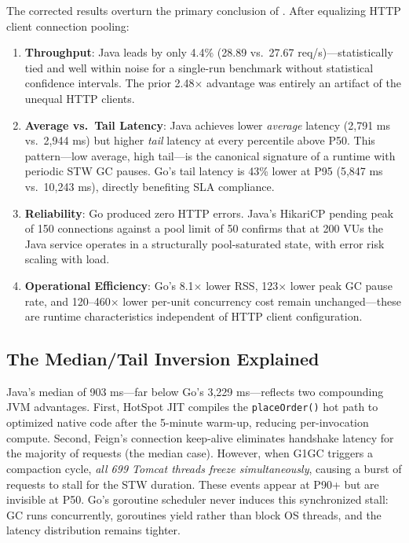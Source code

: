 \documentclass[conference]{IEEEtran}
\begin{document}
The corrected results overturn the primary conclusion of \cite{b10}. After equalizing HTTP client connection pooling:

\begin{enumerate}
\item \textbf{Throughput}: Java leads by only 4.4\% (28.89 vs.\ 27.67 req/s)---statistically tied and well within noise for a single-run benchmark without statistical confidence intervals. The prior 2.48$\times$ advantage was entirely an artifact of the unequal HTTP clients.

\item \textbf{Average vs.\ Tail Latency}: Java achieves lower \textit{average} latency (2,791 ms vs.\ 2,944 ms) but higher \textit{tail} latency at every percentile above P50. This pattern---low average, high tail---is the canonical signature of a runtime with periodic STW GC pauses. Go's tail latency is 43\% lower at P95 (5,847 ms vs.\ 10,243 ms), directly benefiting SLA compliance.

\item \textbf{Reliability}: Go produced zero HTTP errors. Java's HikariCP pending peak of 150 connections against a pool limit of 50 confirms that at 200 VUs the Java service operates in a structurally pool-saturated state, with error risk scaling with load.

\item \textbf{Operational Efficiency}: Go's 8.1$\times$ lower RSS, 123$\times$ lower peak GC pause rate, and 120--460$\times$ lower per-unit concurrency cost remain unchanged---these are runtime characteristics independent of HTTP client configuration.
\end{enumerate}

\subsection{The Median/Tail Inversion Explained}

Java's median of 903 ms---far below Go's 3,229 ms---reflects two compounding JVM advantages. First, HotSpot JIT compiles the \texttt{placeOrder()} hot path to optimized native code after the 5-minute warm-up, reducing per-invocation compute. Second, Feign's connection keep-alive eliminates handshake latency for the majority of requests (the median case). However, when G1GC triggers a compaction cycle, \textit{all 699 Tomcat threads freeze simultaneously}, causing a burst of requests to stall for the STW duration. These events appear at P90+ but are invisible at P50. Go's goroutine scheduler never induces this synchronized stall: GC runs concurrently, goroutines yield rather than block OS threads, and the latency distribution remains tighter.
\end{document}
